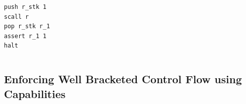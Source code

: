 \documentclass{beamer}
\begin{document}
\begin{frame}[fragile]
\begin{columns}[c]

\begin{center}
\begin{lstlisting}
push r_stk 1
scall r 
pop r_stk r_1
assert r_1 1
halt
\end{lstlisting}
\end{center}


\end{columns}
\end{frame}

\subsection{Enforcing Well Bracketed Control Flow using Capabilities} %
\end{document}
